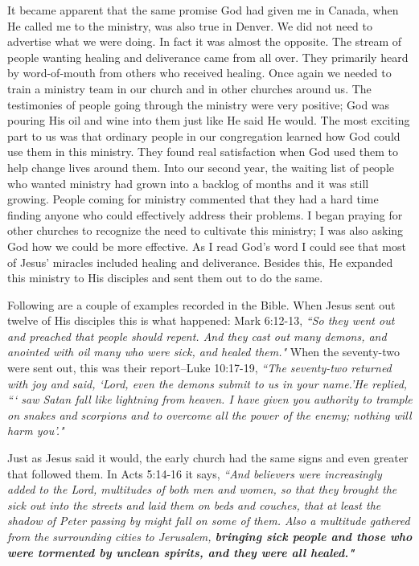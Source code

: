\documentclass[oneside,12pt]{book}
\begin{document}
It became apparent that the same promise God had given me in Canada, when He called me to the ministry, was also true in Denver. We did not need to advertise what we were doing. In fact it was almost the opposite. The stream of people wanting healing and deliverance came from all over. They primarily heard by word-of-mouth from others who received healing. Once again we needed to train a ministry team in our church and in other churches around us. The testimonies of people going through the ministry were very positive; God was pouring His oil and wine into them just like He said He would. The most exciting part to us was that ordinary people in our congregation learned how God could use them in this ministry. They found real satisfaction when God used them to help change lives around them. Into our second year, the waiting list of people who wanted ministry had grown into a backlog of months and it was still growing. People coming for ministry commented that they had a hard time finding anyone who could effectively address their problems. I began praying for other churches to recognize the need to cultivate this ministry; I was also asking God how we could be more effective. As I read God's word I could see that most of Jesus' miracles included healing and deliverance. Besides this, He expanded this ministry to His disciples and sent them out to do the same.

Following are a couple of examples recorded in the Bible. When Jesus sent out twelve of His disciples this is what happened: Mark 6:12-13, \textit{``So they went out and preached that people should repent. And they cast out many demons, and anointed with oil many who were sick, and healed them."} When the seventy-two were sent out, this was their report--Luke 10:17-19, \textit{``The seventy-two returned with joy and said, `Lord, even the demons submit to us in your name.'He replied, ``` saw Satan fall like lightning from heaven. I have given you authority to trample on snakes and scorpions and to overcome all the power of the enemy; nothing will harm you'."}

Just as Jesus said it would, the early church had the same signs and even greater that followed them. In Acts 5:14-16 it says, \textit{``And believers were increasingly added to the Lord, multitudes of both men and women, so that they brought the sick out into the streets and laid them on beds and couches, that at least the shadow of Peter passing by might fall on some of them. Also a multitude gathered from the surrounding cities to Jerusalem, \textbf{bringing sick people and those who were tormented by unclean spirits, and they were all healed."}}
\end{document}
